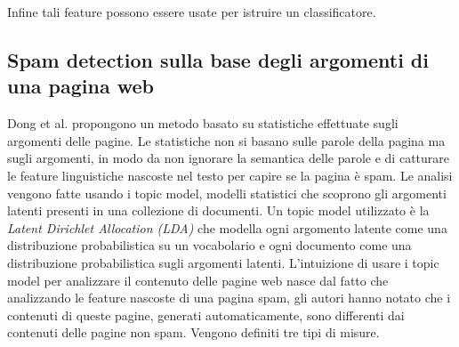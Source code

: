 Infine tali feature possono essere usate per istruire un classificatore.

\subsection{Spam detection sulla base degli argomenti di una pagina web}
Dong et al. \cite{Dong:2012:EDC:2457524.2457693} propongono un metodo basato su statistiche effettuate sugli argomenti delle pagine. Le statistiche non si basano sulle parole della pagina ma sugli argomenti, in modo da non ignorare la semantica delle parole e di catturare le feature linguistiche nascoste nel testo per capire se la pagina è spam. Le analisi vengono fatte usando i topic model, modelli statistici che scoprono gli argomenti latenti presenti in una collezione di documenti. Un topic model utilizzato è la \textit{Latent Dirichlet Allocation (LDA)} che modella ogni argomento latente come una distribuzione probabilistica su un vocabolario e ogni documento come una distribuzione probabilistica sugli argomenti latenti. L'intuizione di usare i topic model per analizzare il contenuto  delle pagine web nasce dal fatto che analizzando le feature nascoste di una pagina spam, gli autori hanno notato che i contenuti di queste pagine, generati automaticamente, sono differenti dai contenuti delle pagine non 
spam. Vengono definiti tre tipi di misure.

